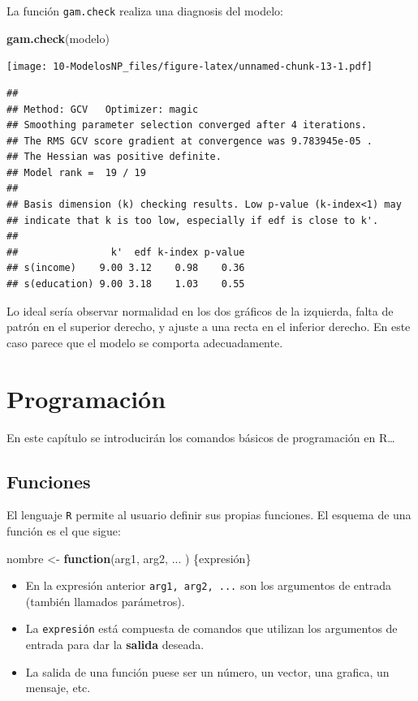 \documentclass[]{book}
\newenvironment{Shaded}{\begin{snugshade}}{\end{snugshade}}
\newcommand{\KeywordTok}[1]{\textcolor[rgb]{0.13,0.29,0.53}{\textbf{#1}}}
\newcommand{\StringTok}[1]{\textcolor[rgb]{0.31,0.60,0.02}{#1}}
\newcommand{\ControlFlowTok}[1]{\textcolor[rgb]{0.13,0.29,0.53}{\textbf{#1}}}
\newcommand{\NormalTok}[1]{#1}
\begin{document}
La función \texttt{gam.check} realiza una diagnosis del modelo:

\begin{Shaded}
\begin{Highlighting}[]
\KeywordTok{gam.check}\NormalTok{(modelo)}
\end{Highlighting}
\end{Shaded}

\texttt{[image: 10-ModelosNP\_files/figure-latex/unnamed-chunk-13-1.pdf]}

\begin{verbatim}
## 
## Method: GCV   Optimizer: magic
## Smoothing parameter selection converged after 4 iterations.
## The RMS GCV score gradient at convergence was 9.783945e-05 .
## The Hessian was positive definite.
## Model rank =  19 / 19 
## 
## Basis dimension (k) checking results. Low p-value (k-index<1) may
## indicate that k is too low, especially if edf is close to k'.
## 
##                k'  edf k-index p-value
## s(income)    9.00 3.12    0.98    0.36
## s(education) 9.00 3.18    1.03    0.55
\end{verbatim}

Lo ideal sería observar normalidad en los dos gráficos de la izquierda,
falta de patrón en el superior derecho, y ajuste a una recta en el
inferior derecho. En este caso parece que el modelo se comporta
adecuadamente.

\chapter{Programación}\label{programacion}

En este capítulo se introducirán los comandos básicos de programación en
R\ldots{}

\section{Funciones}\label{funciones}

El lenguaje \texttt{R} permite al usuario definir sus propias funciones.
El esquema de una función es el que sigue:

\begin{Shaded}
\begin{Highlighting}[]
\NormalTok{nombre <-}\StringTok{ }\ControlFlowTok{function}\NormalTok{(arg1, arg2, ... ) \{expresión\}}
\end{Highlighting}
\end{Shaded}

\begin{itemize}
\item
  En la expresión anterior \texttt{arg1,\ arg2,\ ...} son los argumentos
  de entrada (también llamados parámetros).
\item
  La \texttt{expresión} está compuesta de comandos que utilizan los
  argumentos de entrada para dar la \textbf{salida} deseada.
\item
  La salida de una función puese ser un número, un vector, una grafica,
  un mensaje, etc.
\end{itemize}
\end{document}
